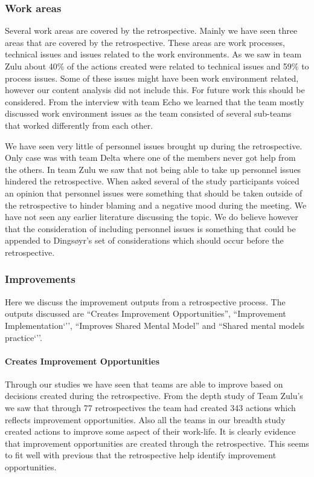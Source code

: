 \subsubsection{Work areas}
Several work areas are covered by the retrospective. Mainly we have seen three areas that are covered by the retrospective. These areas are work processes, technical issues and issues related to the work environments. As we saw in team Zulu about 40\% of the actions created were related to technical issues and 59\% to process issues. Some of these issues might have been work environment related, however our content analysis did not include this. For future work this should be considered. From the interview with team Echo we learned that the team mostly discussed work environment issues as the team consisted of several sub-teams that worked differently from each other. 

We have seen very little of personnel issues brought up during the retrospective. Only case was with team Delta where one of the members never got help from the others. In team Zulu we saw that not being able to take up personnel issues hindered the retrospective. When asked several of the study participants voiced an opinion that personnel issues were something that should be taken outside of the retrospective to hinder blaming and a negative mood during the meeting. We have not seen any earlier literature discussing the topic. We do believe however that the consideration of including personnel issues is something that could be appended to Dingsøyr's \cite{Dingsoyr2004} set of considerations which should occur before the retrospective.

\subsubsection{Improvements}
Here we discuss the improvement outputs from a retrospective process. The outputs discussed are ``Creates Improvement Opportunities'', ``Improvement Implementation`'', ``Improves Shared Mental Model'' and ``Shared mental models practice`''. 

\paragraph{Creates Improvement Opportunities}
Through our studies we have seen that teams are able to improve based on decisions created during the retrospective. From the depth study of Team Zulu's we saw that through 77 retrospectives the team had created 343 actions which reflects improvement opportunities. Also all the teams in our breadth study created actions to improve some aspect of their work-life. It is clearly evidence that improvement opportunities are created through the retrospective. This seems to fit well with previous \cite{Larsen2006, Dingsoyr2004, Drury2012} that the retrospective help identify improvement opportunities. 

